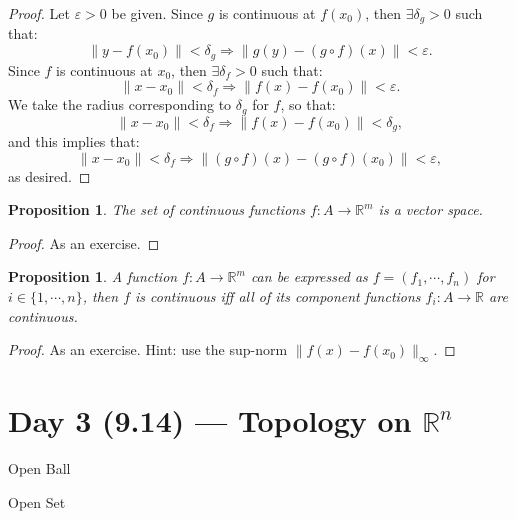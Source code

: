 \documentclass[11pt]{article}
\makeatletter
\newcounter{thmcounter}
\newenvironment{definition}[1]{\begin{defbox}{#1}{}}{\end{defbox}}
\theoremstyle{quiet}
\newtheorem{proposition}[thmcounter]{Proposition}
\newtheorem{proposition}[tcb@cnt@defbox]{Proposition}
\theoremstyle{quietremark}
\makeatother
\begin{document}
\begin{proof}
Let $\varepsilon>0$ be given. Since $g$ is continuous at $f(x_0)$, then $\exists\delta_g>0$ such that:
\[
\|y-f(x_0)\|<\delta_g\Rightarrow\|g(y)-(g\circ f)(x)\|<\varepsilon.
\]
Since $f$ is continuous at $x_0$, then $\exists\delta_f>0$ such that: 
\[
\|x-x_0\|<\delta_f\Rightarrow \|f(x)-f(x_0)\|<\varepsilon.
\]
We take the radius corresponding to  $\delta_g$ for $f$, so that:
\[
\|x-x_0\|<\delta_f\Rightarrow\|f(x)-f(x_0)\|<\delta_g,
\]
and this implies that: 
\[
\|x-x_0\|<\delta_f\Rightarrow\|(g\circ f)(x)-(g\circ f)(x_0)\|<\varepsilon,
\]
as desired.
\end{proof}

\begin{proposition}
The set of continuous functions $f:A\to\mathbb{R}^m$ is a vector space.
\end{proposition}

\begin{proof}
As an exercise.
\end{proof}

\begin{proposition}
A function $f:A\to\mathbb{R}^m$ can be expressed as $f=(f_1,\cdots,f_n)$ for $i\in\{1,\cdots,n\}$, then $f$ is continuous iff all of its component functions $f_i:A\to\mathbb{R}$ are continuous.
\end{proposition}

\begin{proof}
As an exercise. Hint: use the sup-norm $\|f(x)-f(x_0)\|_\infty$.
\end{proof}

\newpage
\section{Day 3 (9.14) --- Topology on $\mathbb{R}^n$}

\begin{definition}{Open Ball}
\end{definition}

\begin{definition}{Open Set}
\end{definition}
\end{document}
